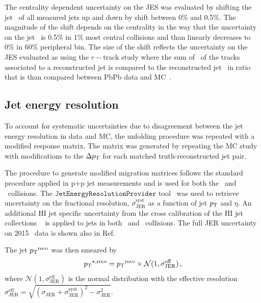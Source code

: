  The centrality dependent uncertainty on the JES was evaluated by shifting the jet \pt\ of all measured jets up and down by shift between 0\% and 0.5\%. The magnitude of the shift depends on the centrality in the way that the uncertainty on the jet \pt\ is 0.5\% in 1\% most central collisions and than linearly decreases to 0\% in 60\% peripheral bin. The size of the shift reflects the uncertainty on the JES evaluated as using the $r-$track study where the sum of \pT\ of the tracks associated to a reconstructed jet is compared to the reconstructed jet \pT\ in ratio that is than compared between PbPb data and MC~\cite{HIjesnote,Aad:2014bxa}.

\subsection{Jet energy resolution}
To account for systematic uncertainties due to disagreement between the jet energy resolution in data and MC, the unfolding procedure was repeated with a modified response matrix. The matrix was generated by repeating the MC study with modifications to the $\Delta \mbox{$p_{\mathrm{T}}$}$ for each matched truth-reconstructed jet pair. 



     The procedure to generate modified migration matrices follows the standard procedure applied in p+p jet measurements 
     and is used for both the \pp\ and \pbpb\ collisions. 
     The $\texttt{JetEnergyResolutionProvider}$ tool~\cite{JERUncertaintyProviderRun2} was used to 
     retrieve uncertainty on the fractional resolution, $\sigma^{\mathrm{syst}}_{\mathrm{JER}}$ as a function of jet $\mbox{$p_{\mathrm{T}}$}$ and $\eta$. An additional HI jet specific uncertainty from the cross calibration of the HI jet collections ~\cite{cc2015} is applied to jets in both \pp\ and \pbpb\ collisions.
     The full JER uncertainty on 2015 \pp\ data is shown also in Ref.~\cite{Aad:1696485}

     The jet $\mbox{$p_{\mathrm{T}}$}^{\mathrm{reco}}$ was then smeared by
     \begin{equation}
	\mbox{$p_{\mathrm{T}}$}^{\star, \mathrm{reco}} = \mbox{$p_{\mathrm{T}}$}^{\mathrm{reco}}\times \mathcal{N}(1,\sigma^{\mathrm{eff}}_{\mathrm{JER}})\,,
     \end{equation}
     where $\mathcal{N}(1,\sigma^{\mathrm{eff}}_{\mathrm{JER}})$ is the normal distribution with the effective resolution $\sigma^{\mathrm{eff}}_{\mathrm{JER}}=\sqrt{(\sigma_{\mathrm{JER}} + \sigma^{\mathrm{syst}}_{\mathrm{JER}})^{2} - \sigma_{\mathrm{JER}}^{2}}$.

